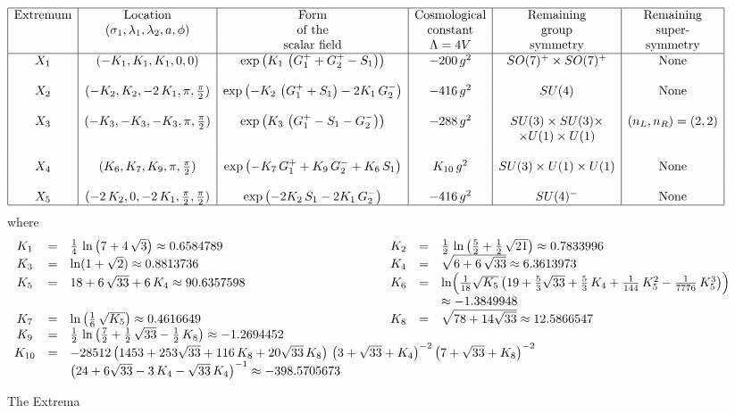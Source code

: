 \documentclass[a4paper,12pt]{article}
\begin{document}
\begin{landscape}
\begin{figure}
\[
\begin{array}{|c|c|c|c|c|c|}
\hline
\mbox{Extremum}&\mbox{Location}&\mbox{Form}&\mbox{Cosmological}&\mbox{Remaining}&\mbox{Remaining}\\
\mbox{}&(\sigma_1,\lambda_1,\lambda_2,a,\phi)&\mbox{of the}&\mbox{constant}&\mbox{group}&\mbox{super-}\\
\mbox{}&\mbox{}&\mbox{scalar field}&\mbox{$\Lambda=4V$}&\mbox{symmetry}&\mbox{symmetry}\\
\hline
X_1 & (-K_1,K_1,K_1,0,0) & \exp\left(K_1\,\left(G_1^++G_2^+-S_1\right)\right) & -200\,g^2 & SO(7)^+ \times SO(7)^+ & \rm{None}\\
&&&&&\\
X_2 & (-K_2,K_2,-2\,K_1,\pi,\frac{\pi}{2}) & \exp\left(-K_2\,\left(G_1^++S_1\right)-2K_1\,G_2^-\right) & -416\,g^2 & SU(4) & \rm{None}\\
&&&&&\\
X_3 & (-K_3, -K_3, -K_3, \pi, \frac{\pi}{2}) &  \exp\left(K_3\,\left(G_1^+-S_1- G_2^-\right)\right) & -288\,g^2 & SU(3)\times SU(3)\times & (n_L,n_R)=(2,2)\\
&&&&\times U(1)\times U(1) &\\
&&&&&\\
X_4 & (K_6,K_7,K_9,\pi, \frac{\pi}{2}) & \exp\left(-K_7\,G_1^+ + K_9\,G_2^- + K_6\,S_1\right) & K_{10}\,g^2 & SU(3)\times U(1)\times U(1) & \rm{None}\\
&&&&&\\
X_5 & (-2\,K_2,0,-2\,K_1,\frac{\pi}{2},\frac{\pi}{2})& \exp\left(-2K_2\,S_1 -2K_1\,G_2^-\right) & -416\,g^2 & SU(4)^- & \rm{None}\\
\hline
\end{array}
\]
where
\[
\begin{array}{cclcccl}
K_1&=&\frac{1}{4}\,\ln\left(7+4\,\sqrt{3}\right)\approx0.6584789 &\qquad&
K_2&=&\frac{1}{2}\,\ln\left(\frac{5}{2}+\frac{1}{2}\,\sqrt{21}\right)\approx0.7833996\\
K_3&=&\ln(1+\sqrt{2})\approx0.8813736&&
K_4&=&\sqrt{6+6\,\sqrt{33}}\approx6.3613973\\
K_5&=&18+6\,\sqrt{33}+6\,K_4\approx90.6357598&&
K_6&=&\ln\Bigl(\frac{1}{18}\sqrt{K_5}\left(19+\frac{5}{3}\sqrt{33}+\frac{5}{3}\,K_4+\frac{1}{144}\,K_5^2-\frac{1}{7776}\,K_5^3\right)\Bigr)\\&&&&&&\approx-1.3849948\\
K_7&=&\ln\left(\frac{1}{6}\,\sqrt{K_5}\right)\approx0.4616649&&
K_8&=&\sqrt{78+14\sqrt{33}}\approx12.5866547\\
K_9&=&\frac{1}{2}\,\ln\left(\frac{7}{2}+\frac{1}{2}\,\sqrt{33}-\frac{1}{2}\,K_8\right)\approx-1.2694452\\
K_{10}&=&\multicolumn{5}{l}{-28512\left(1453+253\sqrt{33}+116\,K_8+20\sqrt{33}\,K_8\right)\,\left(3+\sqrt{33}+K_4\right)^{-2}\left(7+\sqrt{33}+K_8\right)^{-2}}\\
&&\left(24+6\sqrt{33}-3\,K_4-\sqrt{33}\,K_4\right)^{-1}\approx-398.5705673
\end{array}
\]
\caption{The Extrema}
\end{figure}
\end{landscape}
\end{document}
